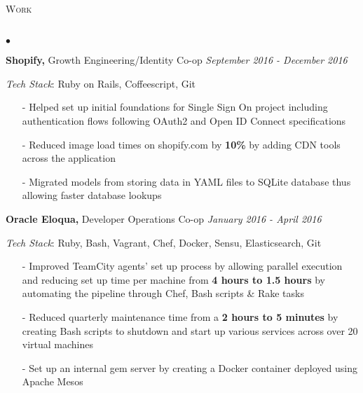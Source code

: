 \documentclass[11pt]{article}
\newcommand{\lineunder}{\vspace*{-8pt} \\ \hspace*{-18pt} \hrulefill \\}
\newcommand{\header}[1]{{\hspace*{-15pt}\vspace*{6pt} \textsc{#1}} \vspace*{-6pt} \lineunder }
\newenvironment{achievements}{\begin{list}{$\bullet$}{\topsep 0pt \itemsep -1.5pt \leftmargin 5pt}}{\vspace*{4pt}\end{list}}
\begin{document}
\header{\fontsize{11.4}{10}\selectfont Work}
\begin{achievements}

\item \textbf{Shopify,} Growth Engineering/Identity Co-op \hfill \textit {September 2016 - December 2016}

\vspace{2pt}
\item[ ] \textit{Tech Stack}: Ruby on Rails, Coffeescript, Git
\vspace{3pt}

\begin{itemize}

\item[-] Helped set up initial foundations for Single Sign On project including authentication flows following OAuth2 and Open ID Connect specifications
\vspace{3pt}
\item[-] Reduced image load times on shopify.com by \textbf{10\%} by adding CDN tools across the application
\vspace{3pt}
\item[-] Migrated models from storing data in YAML files to SQLite database thus allowing faster database lookups

\end{itemize}

\vspace{6pt}

\item \textbf{Oracle Eloqua,} Developer Operations Co-op \hfill \textit {January 2016 - April 2016}

\vspace{2pt}
\item[ ] \textit{Tech Stack}: Ruby, Bash, Vagrant, Chef, Docker, Sensu, Elasticsearch, Git
\vspace{3pt}

\begin{itemize}
\item[-]Improved TeamCity agents' set up process by allowing parallel execution and reducing set up time per machine from \textbf{4 hours to 1.5 hours} by automating the pipeline through Chef, Bash scripts \& Rake tasks
\vspace{3pt}
\item[-]Reduced quarterly maintenance time from a \textbf{2 hours to 5 minutes} by creating Bash scripts to shutdown and start up various services across over 20 virtual machines
\vspace{3pt}
\item[-]Set up an internal gem server by creating a Docker container deployed using Apache Mesos
\end{itemize}


\end{achievements}
\end{document}

